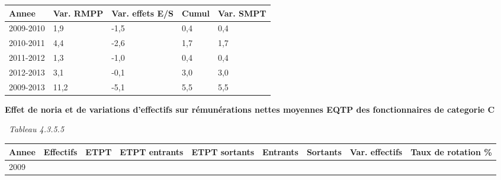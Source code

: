 \begin{longtable}[]{@{}lllll@{}}
\toprule
Annee & Var. RMPP & Var. effets E/S & Cumul & Var. SMPT\tabularnewline
\midrule
\endhead
2009-2010 & 1,9 & -1,5 & 0,4 & 0,4\tabularnewline
2010-2011 & 4,4 & -2,6 & 1,7 & 1,7\tabularnewline
2011-2012 & 1,3 & -1,0 & 0,4 & 0,4\tabularnewline
2012-2013 & 3,1 & -0,1 & 3,0 & 3,0\tabularnewline
2009-2013 & 11,2 & -5,1 & 5,5 & 5,5\tabularnewline
\bottomrule
\end{longtable}

\textbf{Effet de noria et de variations d'effectifs sur rémunérations
nettes moyennes EQTP des fonctionnaires de categorie C}

~\emph{Tableau 4.3.5.5}

\begin{longtable}[]{@{}lllllllll@{}}
\toprule
\begin{minipage}[b]{0.05\columnwidth}\raggedright
Annee\strut
\end{minipage} & \begin{minipage}[b]{0.08\columnwidth}\raggedright
Effectifs\strut
\end{minipage} & \begin{minipage}[b]{0.05\columnwidth}\raggedright
ETPT\strut
\end{minipage} & \begin{minipage}[b]{0.10\columnwidth}\raggedright
ETPT entrants\strut
\end{minipage} & \begin{minipage}[b]{0.10\columnwidth}\raggedright
ETPT sortants\strut
\end{minipage} & \begin{minipage}[b]{0.07\columnwidth}\raggedright
Entrants\strut
\end{minipage} & \begin{minipage}[b]{0.07\columnwidth}\raggedright
Sortants\strut
\end{minipage} & \begin{minipage}[b]{0.11\columnwidth}\raggedright
Var. effectifs\strut
\end{minipage} & \begin{minipage}[b]{0.14\columnwidth}\raggedright
Taux de rotation \%\strut
\end{minipage}\tabularnewline
\midrule
\endhead
\begin{minipage}[t]{0.05\columnwidth}\raggedright
2009\strut
\end{minipage} & \begin{minipage}[t]{0.08\columnwidth}\raggedright

\end{minipage}
\end{longtable}
